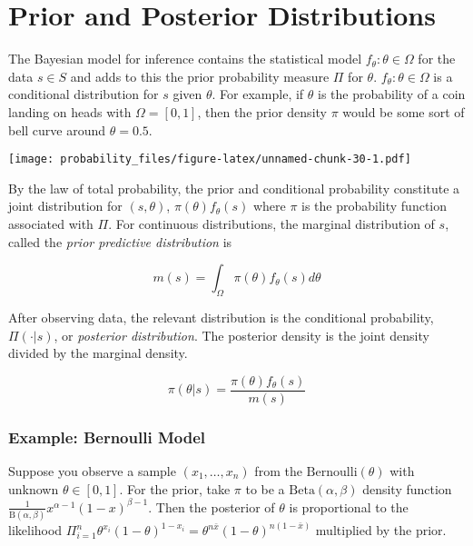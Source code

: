 \documentclass[
]{book}
\begin{document}
\hypertarget{prior-and-posterior-distributions}{%
\section{Prior and Posterior Distributions}\label{prior-and-posterior-distributions}}

The Bayesian model for inference contains the statistical model \({f_\theta: \theta \in \Omega}\) for the data \(s \in S\) and adds to this the prior probability measure \(\Pi\) for \(\theta\). \({f_\theta: \theta \in \Omega}\) is a conditional distribution for \(s\) given \(\theta\). For example, if \(\theta\) is the probability of a coin landing on heads with \(\Omega = [0,1]\), then the prior density \(\pi\) would be some sort of bell curve around \(\theta = 0.5\).

\texttt{[image: probability\_files/figure-latex/unnamed-chunk-30-1.pdf]}

By the law of total probability, the prior and conditional probability constitute a joint distribution for \((s, \theta)\), \(\pi(\theta)f_\theta(s)\) where \(\pi\) is the probability function associated with \(\Pi\). For continuous distributions, the marginal distribution of \(s\), called the \emph{prior predictive distribution} is

\[m(s) = \int_\Omega \pi(\theta)f_\theta(s) d\theta\]

After observing data, the relevant distribution is the conditional probability, \(\Pi(\cdot|s)\), or \emph{posterior distribution}. The posterior density is the joint density divided by the marginal density.

\[\pi(\theta|s) = \frac{\pi(\theta)f_\theta(s)}{m(s)}\]

\hypertarget{example-bernoulli-model}{%
\subsubsection*{Example: Bernoulli Model}\label{example-bernoulli-model}}

Suppose you observe a sample \((x_1, \ldots, x_n)\) from the \(\mathrm{Bernoulli}(\theta)\) with unknown \(\theta \in [0,1]\). For the prior, take \(\pi\) to be a \(\mathrm{Beta}(\alpha,\beta)\) density function \(\frac{1}{\mathrm{B}(\alpha,\beta)} x^{\alpha-1}(1-x)^{\beta-1}\). Then the posterior of \(\theta\) is proportional to the likelihood \(\Pi_{i=1}^n \theta^{x_i} (1-\theta)^{1-x_i} = \theta^{n\bar{x}}(1-\theta)^{n(1-\bar{x})}\) multiplied by the prior.

  
\end{document}
